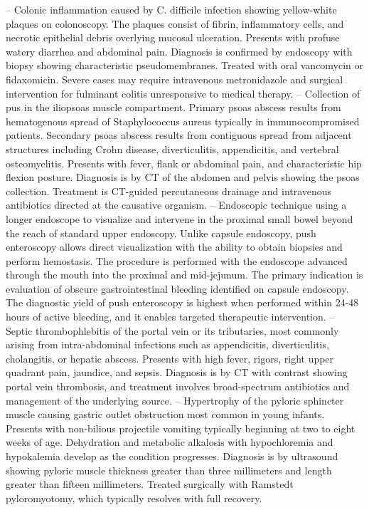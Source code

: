 -- Colonic inflammation caused by C. difficile infection showing yellow-white plaques on colonoscopy. The plaques consist of fibrin, inflammatory cells, and necrotic epithelial debris overlying mucosal ulceration. Presents with profuse watery diarrhea and abdominal pain. Diagnosis is confirmed by endoscopy with biopsy showing characteristic pseudomembranes. Treated with oral vancomycin or fidaxomicin. Severe cases may require intravenous metronidazole and surgical intervention for fulminant colitis unresponsive to medical therapy.
-- Collection of pus in the iliopsoas muscle compartment. Primary psoas abscess results from hematogenous spread of Staphylococcus aureus typically in immunocompromised patients. Secondary psoas abscess results from contiguous spread from adjacent structures including Crohn disease, diverticulitis, appendicitis, and vertebral osteomyelitis. Presents with fever, flank or abdominal pain, and characteristic hip flexion posture. Diagnosis is by CT of the abdomen and pelvis showing the psoas collection. Treatment is CT-guided percutaneous drainage and intravenous antibiotics directed at the causative organism.
-- Endoscopic technique using a longer endoscope to visualize and intervene in the proximal small bowel beyond the reach of standard upper endoscopy. Unlike capsule endoscopy, push enteroscopy allows direct visualization with the ability to obtain biopsies and perform hemostasis. The procedure is performed with the endoscope advanced through the mouth into the proximal and mid-jejunum. The primary indication is evaluation of obscure gastrointestinal bleeding identified on capsule endoscopy. The diagnostic yield of push enteroscopy is highest when performed within 24-48 hours of active bleeding, and it enables targeted therapeutic intervention.
-- Septic thrombophlebitis of the portal vein or its tributaries, most commonly arising from intra-abdominal infections such as appendicitis, diverticulitis, cholangitis, or hepatic abscess. Presents with high fever, rigors, right upper quadrant pain, jaundice, and sepsis. Diagnosis is by CT with contrast showing portal vein thrombosis, and treatment involves broad-spectrum antibiotics and management of the underlying source.
-- Hypertrophy of the pyloric sphincter muscle causing gastric outlet obstruction most common in young infants. Presents with non-bilious projectile vomiting typically beginning at two to eight weeks of age. Dehydration and metabolic alkalosis with hypochloremia and hypokalemia develop as the condition progresses. Diagnosis is by ultrasound showing pyloric muscle thickness greater than three millimeters and length greater than fifteen millimeters. Treated surgically with Ramstedt pyloromyotomy, which typically resolves with full recovery.
